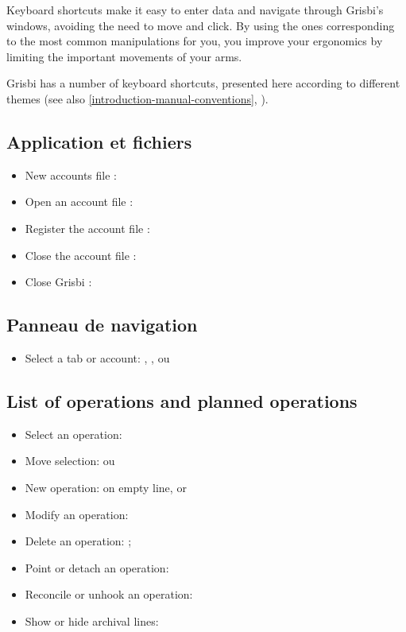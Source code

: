 Keyboard shortcuts make it easy to enter data and navigate through Grisbi's windows, avoiding the need to move and click. By using the ones corresponding to the most common manipulations for you, you improve your ergonomics  by limiting the important movements of your arms.
 
Grisbi has a number of keyboard shortcuts, presented here according to different themes (see also  \vref{introduction-manual-conventions}, ).

\subsection{Application et fichiers}

\begin{itemize}
	\item New accounts file : 
	\item Open an account file : 
	\item Register the account file : 
	\item Close the account file : 
	\item Close Grisbi : 
\end{itemize}


\subsection{Panneau de navigation}

\begin{itemize}
	\item Select a tab or account: , ,  ou 
\end{itemize}

\subsection{List of operations and planned operations}

\begin{itemize}
	\item Select an operation: 
	\item Move selection: ou 
	\item New operation:   on empty line, or 
	\item Modify an operation: 
	\item Delete an operation:  ;
	\item Point or detach an operation:
	\item Reconcile or unhook an operation: 
	\item Show or hide archival lines: 
\end{itemize}


